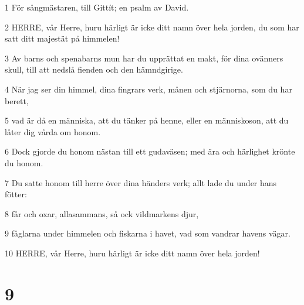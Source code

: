 \par 1 För sångmästaren, till Gittít; en psalm av David.
\par 2 HERRE, vår Herre, huru härligt är icke ditt namn över hela jorden, du som har satt ditt majestät på himmelen!
\par 3 Av barns och spenabarns mun har du upprättat en makt, för dina ovänners skull, till att nedslå fienden och den hämndgirige.
\par 4 När jag ser din himmel, dina fingrars verk, månen och stjärnorna, som du har berett,
\par 5 vad är då en människa, att du tänker på henne, eller en människoson, att du låter dig vårda om honom.
\par 6 Dock gjorde du honom nästan till ett gudaväsen; med ära och härlighet krönte du honom.
\par 7 Du satte honom till herre över dina händers verk; allt lade du under hans fötter:
\par 8 får och oxar, allasammans, så ock vildmarkens djur,
\par 9 fåglarna under himmelen och fiskarna i havet, vad som vandrar havens vägar.
\par 10 HERRE, vår Herre, huru härligt är icke ditt namn över hela jorden!

\chapter{9}

